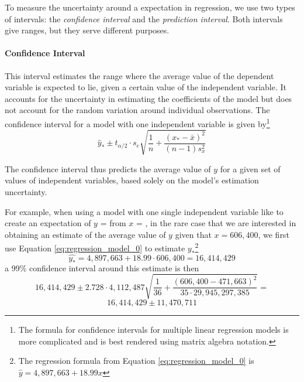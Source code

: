 To measure the uncertainty around a expectation in regression, we use two types of intervals: the \emph{confidence interval} and the \emph{prediction interval}. Both intervals give ranges, but they serve different purposes.

\paragraph{Confidence Interval} This interval estimates the range where the average value of the dependent variable is expected to lie, given a certain value of the independent variable. It accounts for the uncertainty in estimating the coefficients of the model but does not account for the random variation around individual observations. 
The confidence interval for a model with one independent variable is given by\footnote{The formula for confidence intervals for multiple linear regression models is more complicated and is best rendered using matrix algebra notation.}
\begin{equation}
\hat{y}_* \pm t_{\alpha / 2} \cdot s_e \sqrt{\frac{1}{n} + \frac{(x_* - \bar{x})^2}{(n - 1) s_x^2}}
\end{equation}

The confidence interval thus predicts the average value of $y$ for a given set of values of independent variables, based solely on the model's estimation uncertainty.

For example, when using a model with one single independent variable like  to create an expectation of $y$ =  from $x$ = , in the rare case that we are interested in obtaining an estimate of the average value of $y$ given that $x = 606,400$, we first use Equation \ref{eq:regression_model_0} to estimate $y_*$\footnote{The regression formula from Equation \ref{eq:regression_model_0} is $\hat{y} = 4,897,663 + 18.99x$}
\begin{equation*}
  \hat{y_*} = 4,897,663 + 18.99 \cdot 606,400 = 16,414,429
\end{equation*}
a 99\% confidence interval around this estimate is then
\begin{equation*}
  16,414,429 \pm 2.728 \cdot 4,112,487 \sqrt{\frac{1}{36} + \frac{(606,400 - 471,663)^2}{35 \cdot 29,945,297,385}} =
\end{equation*}
\begin{equation*}
16,414,429 \pm 11,470,711
\end{equation*}

